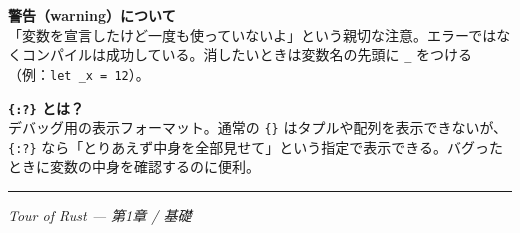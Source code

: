 \documentclass[12pt,a4paper]{article}
\begin{document}
\begin{qabox}
\textbf{警告（warning）について}\\
「変数を宣言したけど一度も使っていないよ」という親切な注意。エラーではなくコンパイルは成功している。消したいときは変数名の先頭に \texttt{\_} をつける（例：\texttt{let \_x = 12}）。
\end{qabox}

\vspace{4mm}

\begin{qabox}
\textbf{\texttt{\{:?\}} とは？}\\
デバッグ用の表示フォーマット。通常の \texttt{\{\}} はタプルや配列を表示できないが、\texttt{\{:?\}} なら「とりあえず中身を全部見せて」という指定で表示できる。バグったときに変数の中身を確認するのに便利。
\end{qabox}

\vspace{6mm}
\hrule
\vspace{2mm}
{\small\color{gray}\textit{Tour of Rust — 第1章 / 基礎}}
\end{document}
